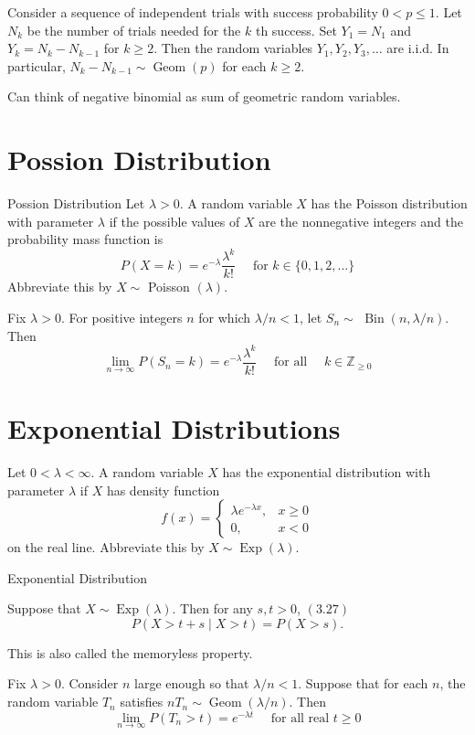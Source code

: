 \documentclass[11pt]{elegantbook}
\begin{document}
\begin{corollary}
 Consider a sequence of independent trials with success probability $0<p \leq 1$. Let $N_k$ be the number of trials needed for the $k$ th success. Set $Y_1=N_1$ and $Y_k=N_k-N_{k-1}$ for $k \geq 2$. Then the random variables $Y_1, Y_2, Y_3, \ldots$ are i.i.d. In particular, $N_k-N_{k-1} \sim \operatorname{Geom}(p)$ for each $k \geq 2$.
\end{corollary}
\begin{note}
    Can think of negative binomial as sum of geometric random variables.
\end{note}
\section{Possion Distribution}
\begin{definition}{Possion Distribution}
   Let $\lambda>0$. A random variable $X$ has the Poisson distribution with parameter $\lambda$ if the possible values of $X$ are the nonnegative integers and the probability mass function is
    $$
    P(X=k)=e^{-\lambda} \frac{\lambda^k}{k !} \quad \text { for } k \in\{0,1,2, \ldots\}
    $$
    Abbreviate this by $X \sim$ Poisson $(\lambda)$.
\end{definition}
\begin{theorem}
 Fix $\lambda>0$. For positive integers $n$ for which $\lambda / n<1$, let $S_n \sim$ $\operatorname{Bin}(n, \lambda / n)$. Then
$$
\lim _{n \rightarrow \infty} P\left(S_n=k\right)=e^{-\lambda} \frac{\lambda^k}{k !} \quad \text { for all } \quad k \in \mathbb{Z}_{\geq 0}
$$
\end{theorem}
\section{Exponential Distributions}
\begin{definition}
 Let $0<\lambda<\infty$. A random variable $X$ has the exponential distribution with parameter $\lambda$ if $X$ has density function
$$
f(x)= \begin{cases}\lambda e^{-\lambda x}, & x \geq 0 \\ 0, & x<0\end{cases}
$$
on the real line. Abbreviate this by $X \sim \operatorname{Exp}(\lambda)$.
\end{definition}{Exponential Distribution}
\begin{theorem}
 Suppose that $X \sim \operatorname{Exp}(\lambda)$. Then for any $s, t>0$, $(3.27)$
$$
P(X>t+s \mid X>t)=P(X>s) .
$$
\end{theorem}
\begin{note}
This is also called the memoryless property.
\end{note}
\begin{theorem}
 Fix $\lambda>0$. Consider $n$ large enough so that $\lambda / n<1$. Suppose that for each $n$, the random variable $T_n$ satisfies $n T_n \sim \operatorname{Geom}(\lambda / n)$. Then
$$
\lim _{n \rightarrow \infty} P\left(T_n>t\right)=e^{-\lambda t} \quad \text { for all real } t \geq 0
$$
\end{theorem}
\end{document}
